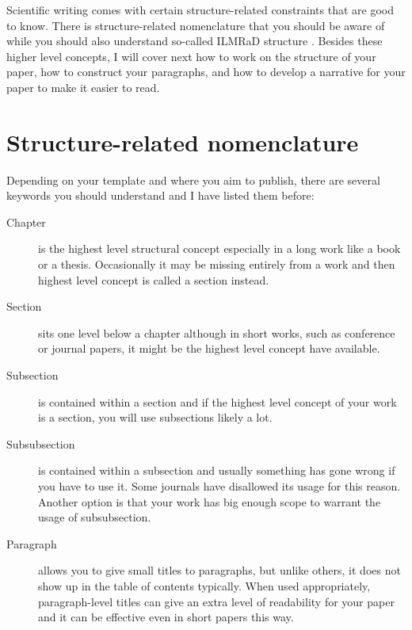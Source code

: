 Scientific writing comes with certain structure-related constraints that are good to know.
There is structure-related nomenclature that you should be aware of while you should also understand so-called ILMRaD structure \citep{botchkarev2025academic}.
Besides these higher level concepts, I will cover next how to work on the structure of your paper, how to construct your paragraphs, and how to develop a narrative for your paper to make it easier to read.


\section{Structure-related nomenclature}

Depending on your template and where you aim to publish, there are several keywords you should understand and I have listed them before:

\begin{description}
    \item[Chapter] is the highest level structural concept especially in a long work like a book or a thesis. Occasionally it may be missing entirely from a work and then highest level concept is called a section instead. %
    \item[Section] sits one level below a chapter although in short works, such as conference or journal papers, it might be the highest level concept have available. %
    \item[Subsection] is contained within a section and if the highest level concept of your work is a section, you will use subsections likely a lot. %
    \item[Subsubsection] is contained within a subsection and usually something has gone wrong if you have to use it. Some journals have disallowed its usage for this reason. Another option is that your work has big enough scope to warrant the usage of subsubsection. %
    \item[Paragraph] allows you to give small titles to paragraphs, but unlike others, it does not show up in the table of contents typically. When used appropriately, paragraph-level titles can give an extra level of readability for your paper and it can be effective even in short papers this way. %
\end{description}

